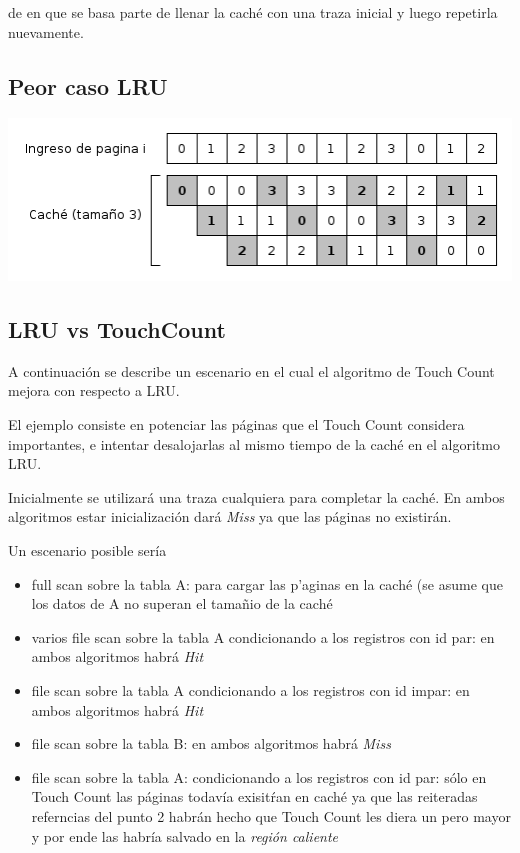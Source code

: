 \documentclass[11pt, a4paper, spanish]{article}
\begin{document}
de en que se basa
parte de llenar la cach\'e con una traza inicial y luego repetirla nuevamente.  
	
\subsection{ Peor caso LRU}
	\begin{center}
	\includegraphics[scale=0.65]{diagramas/LRUPathological.png}\\
	\end{center}

\subsection{ LRU vs TouchCount}

A continuaci\'on se describe un escenario en el cual el algoritmo de Touch Count mejora con respecto a LRU.

El ejemplo consiste en potenciar las p\'aginas que el Touch Count considera importantes, e intentar desalojarlas al mismo tiempo de la cach\'e en el
algoritmo LRU.

Inicialmente se utilizar\'a una traza cualquiera para completar la cach\'e. En ambos algoritmos estar inicializaci\'on dar\'a \textit{Miss} ya que
las p\'aginas no existir\'an.

Un escenario posible ser\'ia

\begin{itemize}
	\item{full scan sobre la tabla A: para cargar las p'aginas en la cach\'e (se asume que los datos de A no superan el tama\~{n}io de la cach\'e}
	\item{varios file scan sobre la tabla A condicionando a los registros con id par: en ambos algoritmos habr\'a \textit{Hit}}
	\item{file scan sobre la tabla A condicionando a los registros con id impar: en ambos algoritmos habr\'a \textit{Hit}}
	\item{file scan sobre la tabla B: en ambos algoritmos habr\'a \textit{Miss}}
	\item{file scan sobre la tabla A: condicionando a los registros con id par: s\'olo en Touch Count las p\'aginas todav\'ia exisit\'ran en cach\'e
ya que las reiteradas referncias del punto 2 habr\'an hecho que Touch Count les diera un pero mayor y por ende las habr\'ia salvado en la \textit{regi\'on caliente}}
\end{itemize}
\end{document}
